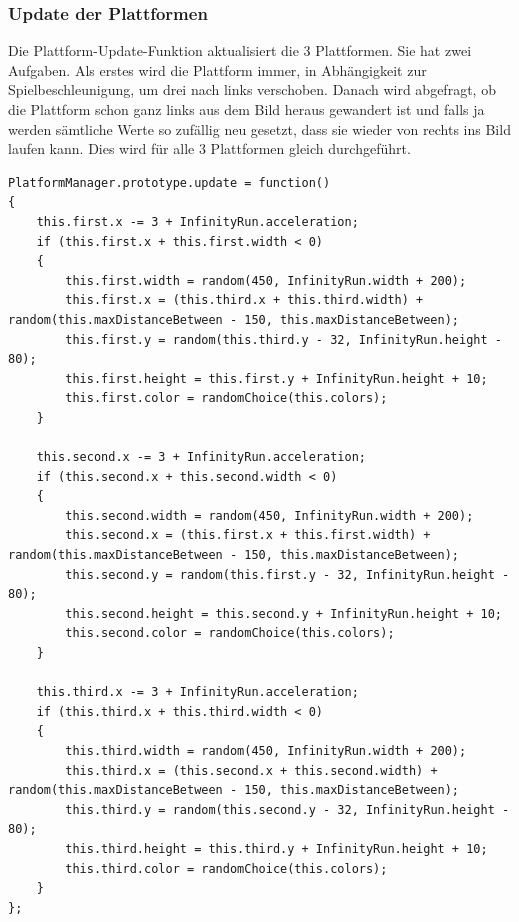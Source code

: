 \subsubsection{Update der Plattformen}
Die Plattform-Update-Funktion aktualisiert die 3 Plattformen. Sie hat zwei Aufgaben. Als erstes wird die Plattform immer, in Abhängigkeit zur Spielbeschleunigung, um drei nach links verschoben. Danach wird abgefragt, ob die Plattform schon ganz links aus dem Bild heraus gewandert ist und falls ja werden sämtliche Werte so zufällig neu gesetzt, dass sie wieder von rechts ins Bild laufen kann. Dies wird für alle 3 Plattformen gleich durchgeführt.
\lstset{language=java}
\begin{lstlisting}[frame=single]
PlatformManager.prototype.update = function() 
{
	this.first.x -= 3 + InfinityRun.acceleration;
	if (this.first.x + this.first.width < 0) 
	{
		this.first.width = random(450, InfinityRun.width + 200);
		this.first.x = (this.third.x + this.third.width) + random(this.maxDistanceBetween - 150, this.maxDistanceBetween);
		this.first.y = random(this.third.y - 32, InfinityRun.height - 80);
		this.first.height = this.first.y + InfinityRun.height + 10;
		this.first.color = randomChoice(this.colors);
	}

	this.second.x -= 3 + InfinityRun.acceleration;
	if (this.second.x + this.second.width < 0) 
	{
		this.second.width = random(450, InfinityRun.width + 200);
		this.second.x = (this.first.x + this.first.width) + random(this.maxDistanceBetween - 150, this.maxDistanceBetween);
		this.second.y = random(this.first.y - 32, InfinityRun.height - 80);
		this.second.height = this.second.y + InfinityRun.height + 10;
		this.second.color = randomChoice(this.colors);
	}

	this.third.x -= 3 + InfinityRun.acceleration;
	if (this.third.x + this.third.width < 0) 
	{
		this.third.width = random(450, InfinityRun.width + 200);
		this.third.x = (this.second.x + this.second.width) + random(this.maxDistanceBetween - 150, this.maxDistanceBetween);
		this.third.y = random(this.second.y - 32, InfinityRun.height - 80);
		this.third.height = this.third.y + InfinityRun.height + 10;
		this.third.color = randomChoice(this.colors);
	}
};
\end{lstlisting}
